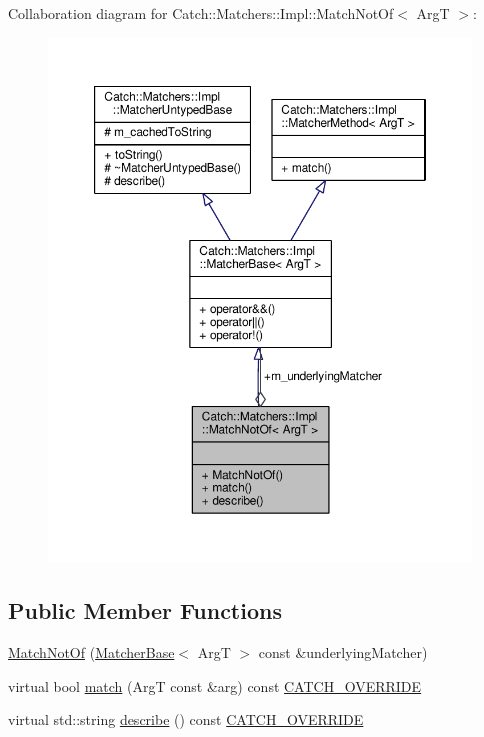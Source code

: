 Collaboration diagram for Catch\-:\-:Matchers\-:\-:Impl\-:\-:Match\-Not\-Of$<$ Arg\-T $>$\-:
\nopagebreak
\begin{figure}[H]
\begin{center}
\leavevmode
\includegraphics[width=350pt]{struct_catch_1_1_matchers_1_1_impl_1_1_match_not_of__coll__graph}
\end{center}
\end{figure}
\subsection*{Public Member Functions}
\begin{DoxyCompactItemize}
\item 
\hyperlink{struct_catch_1_1_matchers_1_1_impl_1_1_match_not_of_a47afdd9e4c3354cef85adc3186097ae4}{Match\-Not\-Of} (\hyperlink{struct_catch_1_1_matchers_1_1_impl_1_1_matcher_base}{Matcher\-Base}$<$ Arg\-T $>$ const \&underlying\-Matcher)
\item 
virtual bool \hyperlink{struct_catch_1_1_matchers_1_1_impl_1_1_match_not_of_a1b9ad6566e4ab0f292d2903f557307cc}{match} (Arg\-T const \&arg) const \hyperlink{catch_8hpp_a8ecdce4d3f57835f707915ae831eb847}{C\-A\-T\-C\-H\-\_\-\-O\-V\-E\-R\-R\-I\-D\-E}
\item 
virtual std\-::string \hyperlink{struct_catch_1_1_matchers_1_1_impl_1_1_match_not_of_a62bdc7dcb9ff000438a4ed3d5483a248}{describe} () const \hyperlink{catch_8hpp_a8ecdce4d3f57835f707915ae831eb847}{C\-A\-T\-C\-H\-\_\-\-O\-V\-E\-R\-R\-I\-D\-E}
\end{DoxyCompactItemize}
